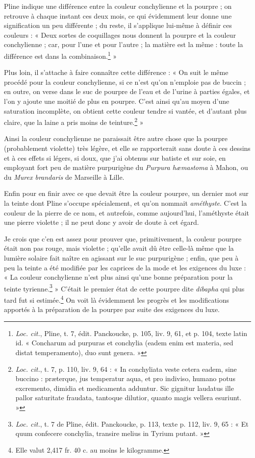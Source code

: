 \documentclass[a4paper, 11pt, oneside, polutonikogreek, french]{article}
\begin{document}
Pline indique une différence entre la couleur conchylienne et la pourpre ; on retrouve à chaque instant ces deux mois, ce qui évidemment leur donne une signification un peu différente ; du reste, il s'applique lui-même à définir ces couleurs : « Deux sortes de coquillages nous donnent la pourpre et la couleur conchylienne ; car, pour l'une et pour l'autre ; la matière est la même : toute la différence est dans la combinaison.\footnote{\emph{Loc. cit.}, Pline, t. 7, édit. Panckoucke, p. 105, liv. 9, 61, et p. 104, texte latin id. « Concharum ad purpuras et conchylia (eadem enim est materia, sed distat temperamento), duo sunt genera. »} »

Plus loin, il s'attache à faire connaître cette différence : « On suit le même procédé pour la couleur conchylienne, si ce n'est qu'on n'emploie pas de buccin ; en outre, on verse dans le suc de pourpre de l'eau et de l'urine à parties égales, et l'on y ajoute une moitié de plus en pourpre. C'est ainsi qu'au moyen d'une saturation incomplète, on obtient cette couleur tendre si vantée, et d'autant plus claire, que la laine a pris moins de teinture.\footnote{\emph{Loc. cit.}, t. 7, p. 110, liv. 9, 64 : « In conchyliata veste cetera eadem, sine buccino : præterque, jus temperatur aqua, et pro indiviso, humano potus excremento, dimidia et medicamenta adduntur. Sic gignitur laudatus ille pallor saturitate fraudata, tantoque dilutior, quanto magis vellera esuriunt. »} »

Ainsi la couleur conchylienne ne paraissait être autre chose que la pourpre (probablement violette) très légère, et elle se rapporterait sans doute à ces dessins et à ces effets si légers, si doux, que j'ai obtenus sur batiste et sur soie, en employant fort peu de matière purpurigène du \emph{Purpura hæmastoma} à Mahon, ou du \emph{Murex brandaris} de Marseille à Lille.

Enfin pour en finir avec ce que devait être la couleur pourpre, un dernier mot sur la teinte dont Pline s'occupe spécialement, et qu'on nommait \emph{améthyste}. C'est la couleur de la pierre de ce nom, et autrefois, comme aujourd'hui, l'améthyste était une pierre violette ; il ne peut donc y avoir de doute à cet égard.

Je crois que c'en est assez pour prouver que, primitivement, la couleur pourpre était non pas rouge, mais violette ; qu'elle avait dû être celle-là même que la lumière solaire fait naître en agissant sur le suc purpurigène ; enfin, que peu à peu la teinte a été modifiée par les caprices de la mode et les exigences du luxe : « La couleur conchylienne n'est plus ainsi qu'une bonne préparation pour la teinte tyrienne.\footnote{\emph{Loc. cit.}, t. 7 de Pline, édit. Panckoucke, p. 113, texte p. 112, liv. 9, 65 : « Et quum confecere conchylia, transire melius in Tyrium putant. »} » C'était le premier état de cette pourpre dite \emph{dibapha} qui plus tard fut si estimée.\footnote{Elle valut 2,417 fr. 40 c. au moins le kilogramme.} On voit là évidemment les progrès et les modifications apportés à la préparation de la pourpre par suite des exigences du luxe.
\end{document}
